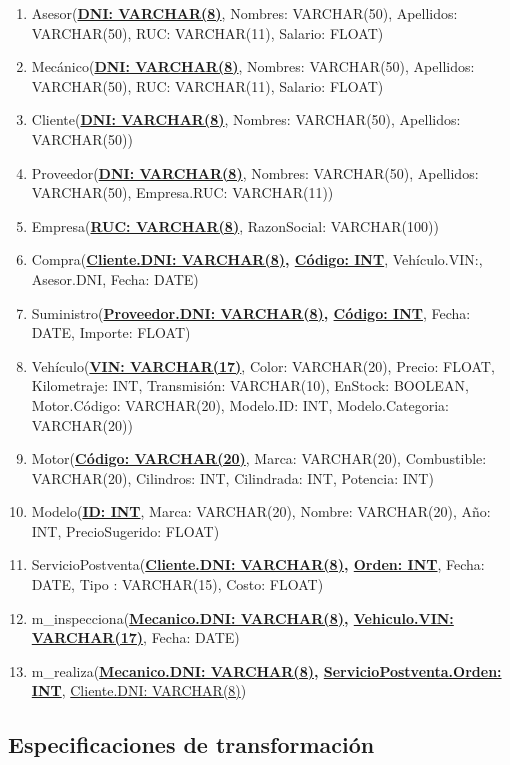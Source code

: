 \documentclass[12pt]{article}
\begin{document}
\begin{enumerate}
\item Asesor(\textbf{\underline{DNI: VARCHAR(8)}}, Nombres: VARCHAR(50), Apellidos: VARCHAR(50), RUC: VARCHAR(11), Salario: FLOAT)
\item Mecánico(\textbf{\underline{DNI: VARCHAR(8)}}, Nombres: VARCHAR(50), Apellidos: VARCHAR(50), RUC: VARCHAR(11), Salario: FLOAT)
\item Cliente(\textbf{\underline{DNI: VARCHAR(8)}}, Nombres: VARCHAR(50), Apellidos: VARCHAR(50))
\item Proveedor(\textbf{\underline{DNI: VARCHAR(8)}}, Nombres: VARCHAR(50), Apellidos: VARCHAR(50), Empresa.RUC: VARCHAR(11))
\item Empresa(\textbf{\underline{RUC: VARCHAR(8)}}, RazonSocial: VARCHAR(100))
\item Compra(\textbf{\underline{Cliente.DNI: VARCHAR(8)}, \underline{Código: INT}}, Vehículo.VIN:, Asesor.DNI, Fecha: DATE)
\item Suministro(\textbf{\underline{Proveedor.DNI: VARCHAR(8)}, \underline{Código: INT}}, Fecha: DATE, Importe: FLOAT)
\item Vehículo(\textbf{\underline{VIN: VARCHAR(17)}}, Color: VARCHAR(20), Precio: FLOAT, Kilometraje: INT, Transmisión: VARCHAR(10), EnStock: BOOLEAN, Motor.Código: VARCHAR(20), Modelo.ID: INT, Modelo.Categoria: VARCHAR(20))
\item Motor(\textbf{\underline{Código: VARCHAR(20)}}, Marca: VARCHAR(20), Combustible: VARCHAR(20), Cilindros: INT, Cilindrada: INT, Potencia: INT)
\item Modelo(\textbf{\underline{ID: INT}}, Marca: VARCHAR(20), Nombre: VARCHAR(20), Año: INT, PrecioSugerido: FLOAT)
\item ServicioPostventa(\textbf{\underline{Cliente.DNI: VARCHAR(8)}, \underline{Orden: INT}}, Fecha: DATE, Tipo : VARCHAR(15), Costo: FLOAT)
\item m\_inspecciona(\textbf{\underline{Mecanico.DNI: VARCHAR(8)}, \underline{Vehiculo.VIN: VARCHAR(17)}}, Fecha: DATE)
\item m\_realiza(\textbf{\underline{Mecanico.DNI: VARCHAR(8)}, \underline{ServicioPostventa.Orden: INT}}, \underline{Cliente.DNI: VARCHAR(8)})
\end{enumerate}

\subsection{Especificaciones de transformaci\'on}
\end{document}
